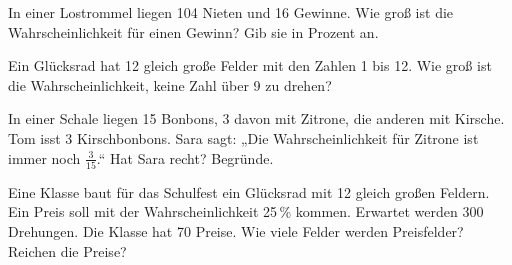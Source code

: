 \documentclass[11pt]{article}
\newcommand{\aufg}[3]{\par\noindent\makebox[0pt][r]{#3}\begin{minipage}[t]{\linewidth}#1\end{minipage}\par}
\newcommand{\nr}[1]{\makebox[7mm][l]{\textbf{#1}}}
\newlength{\kr}
\begin{document}
\medskip
\aufg{\nr{2.}In einer Lostrommel liegen 104 Nieten und 16 Gewinne. Wie groß ist die Wahrscheinlichkeit für einen Gewinn? Gib sie in Prozent an.}{}{}
\medskip
\aufg{\nr{3.}Ein Glücksrad hat 12 gleich große Felder mit den Zahlen 1 bis 12. Wie groß ist die Wahrscheinlichkeit, keine Zahl über 9 zu drehen?}{}{}
\medskip
\aufg{\nr{4.}In einer Schale liegen 15 Bonbons, 3 davon mit Zitrone, die anderen mit Kirsche. Tom isst 3 Kirschbonbons. Sara sagt: „Die Wahrscheinlichkeit für Zitrone ist immer noch $\frac{3}{15}$.“ Hat Sara recht? Begründe.}{}{}
\medskip
\aufg{\nr{5.}Eine Klasse baut für das Schulfest ein Glücksrad mit 12 gleich großen Feldern. Ein Preis soll mit der Wahrscheinlichkeit 25\,\% kommen. Erwartet werden 300 Drehungen. Die Klasse hat 70 Preise. Wie viele Felder werden Preisfelder? Reichen die Preise?}{}{{\scriptsize\color{mbgrau}Ziel\hspace{2mm}}}
\medskip
\par\vspace{3mm}\setlength{\kr}{\dimexpr\pagegoal-\pagetotal-10mm\relax}%
\ifdim\kr>12mm\noindent{\scriptsize\color{mbgrau}Platz zum Rechnen}\par\nointerlineskip\vspace{1mm}\noindent
\begin{tikzpicture}\clip (0,0) rectangle ({\linewidth-0.5mm},\kr);\draw[black!16,line width=0.3pt,step=5mm] (0,0) grid (\linewidth,\kr);\end{tikzpicture}\fi\par
\end{document}
